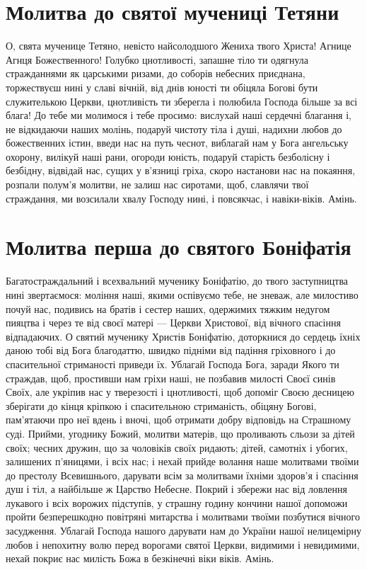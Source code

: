\documentclass[chapters.tex]{subfiles}
\begin{document}
\section{Молитва до святої мучениці Тетяни}
О, свята мученице Тетяно, невісто найсолодшого Жениха твого Христа! Агнице Агнця Божественного! Голубко цнотливості, запашне тіло ти одягнула стражданнями як царськими ризами, до соборів небесних приєднана, торжествуєш нині у славі вічній, від днів юності ти обіцяла Богові бути служителькою Церкви, цнотливість ти зберегла і полюбила Господа більше за всі блага! До тебе ми молимося і тебе просимо: вислухай наші сердечні благання і, не відкидаючи наших молінь, подаруй чистоту тіла і душі, надихни любов до божественних істин, введи нас на путь чеснот, виблагай нам у Бога ангельську охорону, вилікуй наші рани, огороди юність, подаруй старість безболісну і безбідну, відвідай нас, сущих у в’язниці гріха, скоро настанови нас на покаяння, розпали полум’я молитви, не залиш нас сиротами, щоб, славлячи твої страждання, ми возсилали хвалу Господу нині, і повсякчас, і навіки-віків. Амінь.

\section{Молитва перша до святого Боніфатія}
Багатостраждальний і всехвальний мученику Боніфатію, до твого заступництва нині звертаємося: моління наші, якими оспівуємо тебе, не зневаж, але милостиво почуй нас, подивись на братів і сестер наших, одержимих тяжким недугом пияцтва і через те від своєї матері — Церкви Христової, від вічного спасіння відпадаючих. О святий мученику Христів Боніфатію, доторкнися до сердець їхніх даною тобі від Бога благодаттю, швидко підніми від падіння гріховного і до спасительної стриманості приведи їх. Ублагай Господа Бога, заради Якого ти страждав, щоб, простивши нам гріхи наші, не позбавив милості Своєї синів Своїх, але укріпив нас у тверезості і цнотливості, щоб допоміг Своєю десницею зберігати до кінця кріпкою і спасительною стриманість, обіцяну Богові, пам’ятаючи про неї вдень і вночі, щоб отримати добру відповідь на Страшному суді. Прийми, угоднику Божий, молитви матерів, що проливають сльози за дітей своїх; чесних дружин, що за чоловіків своїх ридають; дітей, самотніх і убогих, залишених п’яницями, і всіх нас; і нехай прийде волання наше молитвами твоїми до престолу Всевишнього, дарувати всім за молитвами їхніми здоров’я і спасіння душ і тіл, а найбільше ж Царство Небесне. Покрий і збережи нас від ловлення лукавого і всіх ворожих підступів, у страшну годину кончини нашої допоможи пройти безперешкодно повітряні митарства і молитвами твоїми позбутися вічного засудження. Ублагай Господа нашого дарувати нам до України нашої нелицемірну любов і непохитну волю перед ворогами святої Церкви, видимими і невидимими, нехай покриє нас милість Божа в безкінечні віки віків. Амінь.
\end{document}
